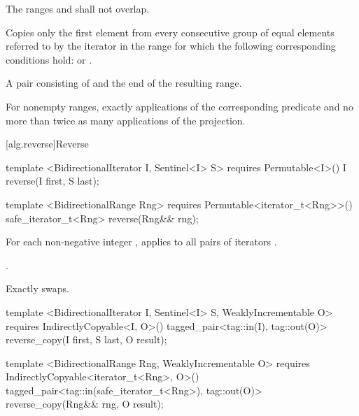 \begin{itemdescr}
\pnum
\requires
The ranges
and
shall not overlap.

\pnum
\effects
Copies only the first element from every consecutive group of equal elements referred to by
the iterator
in the range
for which the following corresponding conditions hold:
or
.

\pnum
\returns
A pair consisting of  and the end of the resulting range.

\pnum
\complexity
For nonempty ranges, exactly
applications of the corresponding predicate and no more than twice as many
applications of the projection.
\end{itemdescr}

[alg.reverse]{Reverse}

%
\begin{itemdecl}
template <BidirectionalIterator I, Sentinel<I> S>
  requires Permutable<I>()
  I reverse(I first, S last);

template <BidirectionalRange Rng>
  requires Permutable<iterator_t<Rng>>()
  safe_iterator_t<Rng>
    reverse(Rng&& rng);
\end{itemdecl}

\begin{itemdescr}
\pnum
\effects
For each non-negative integer
,
applies
to all pairs of iterators
.

\pnum
\returns {}.

\pnum
\complexity
Exactly
swaps.
\end{itemdescr}

%
\begin{itemdecl}
template <BidirectionalIterator I, Sentinel<I> S, WeaklyIncrementable O>
  requires IndirectlyCopyable<I, O>()
  tagged_pair<tag::in(I), tag::out(O)> reverse_copy(I first, S last, O result);

template <BidirectionalRange Rng, WeaklyIncrementable O>
  requires IndirectlyCopyable<iterator_t<Rng>, O>()
  tagged_pair<tag::in(safe_iterator_t<Rng>), tag::out(O)>
    reverse_copy(Rng&& rng, O result);
\end{itemdecl}

